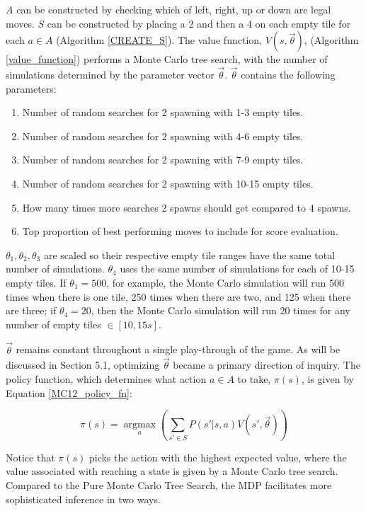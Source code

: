 \documentclass{article}
\DeclareMathOperator*{\argmax}{argmax}
\begin{document}
$A$ can be constructed by checking which of left, right, up or down are legal moves. $S$ can be constructed by placing a 2 and then a 4 on each empty tile for each $a \in A$ (Algorithm \ref{CREATE_S}). The value function, $V(s, \vec{\theta})$,  (Algorithm \ref{value_function}) performs a Monte Carlo tree search, with the number of simulations determined by the parameter vector $\vec{\theta}$.  $\vec{\theta}$ contains the following parameters:
\begin{enumerate}
	\item Number of random searches for 2 spawning with 1-3 empty tiles.
	\item Number of random searches for 2 spawning with 4-6 empty tiles.
	\item Number of random searches for 2 spawning with 7-9 empty tiles.
	\item Number of random searches for 2 spawning with 10-15 empty tiles.
	\item How many times more searches 2 spawns should get compared to 4 spawns.
	\item Top proportion of best performing moves to include for score evaluation.
\end{enumerate}

$\theta_1, \theta_2, \theta_3$ are scaled so their respective empty tile ranges have the same total number of simulations. $\theta_4$ uses the same number of simulations for each of 10-15 empty tiles.  If $\theta_1 = 500$, for example, the Monte Carlo simulation will run 500 times when there is one tile, 250 times when there are two, and 125 when there are three; if $\theta_4 = 20$, then the Monte Carlo simulation will run 20 times for any number of empty tiles $\in [10, 15s]$. 

$\vec{\theta}$ remains constant throughout a single play-through of the game.  As will be discussed in Section 5.1, optimizing $\vec{\theta}$ became a primary direction of inquiry. The policy function, which determines what action $a \in A$ to take, $\pi(s)$, is given by Equation \ref{MC12_policy_fn}:

\begin{equation}
\label{MC12_policy_fn}
\pi(s) = \argmax\limits_{a}\left( \sum\limits_{s' \in S} P(s'|s, a)V(s', \vec{\theta}) \right)
\end{equation}


Notice that $\pi(s)$ picks the action with the highest expected value, where the value associated with reaching a state is given by a Monte Carlo tree search.  Compared to the Pure Monte Carlo Tree Search, the MDP facilitates more sophisticated inference in two ways. 
\end{document}
